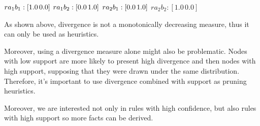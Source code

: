 $r a_1 b_1 : [1.0 \, 0.0] \\$
$r a_1 b_2 : [0.0 \, 1.0] \\$
$r a_2 b_1 : [0.0 \, 1.0] \\$
$r a_2 b_2 : [1.0 \, 0.0]$

As shown above, divergence is not a monotonically decreasing measure, thus it can only be used as heuristics.


Moreover, using a divergence measure alone might also be problematic. Nodes with low support are more likely to present high divergence and then nodes with high support, supposing that they were drawn under the same distribution. Therefore, it's important to use divergence combined with support as pruning heuristics.

Moreover, we are interested not only in rules with high confidence, but also rules with high support so more facts can be derived.





